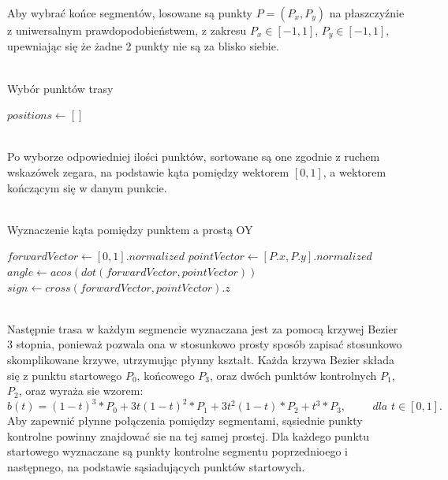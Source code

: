 Aby wybrać końce segmentów, losowane są punkty $P=(P_x,P_y)$ na płaszczyźnie z uniwersalnym prawdopodobieństwem, z zakresu $P_x \in [-1, 1]$, $P_y \in [-1, 1]$, upewniając się że żadne 2 punkty nie są za blisko siebie.
\\\phantom{.}\\
\begin{algorithm}[H]
\caption{Wybór punktów trasy}\label{alg:two}
$positions \gets []$\;
\end{algorithm}
\phantom{.}\\
Po wyborze odpowiedniej ilości punktów, sortowane są one zgodnie z ruchem wskazówek zegara, na podstawie kąta pomiędzy wektorem $[0, 1]$, a wektorem kończącym się w danym punkcie.
\\\\
\begin{algorithm}[H]
    \caption{Wyznaczenie kąta pomiędzy punktem a prostą OY}\label{alg:two}
    $forwardVector \gets [0, 1].normalized$\;
    $pointVector \gets [P.x, P.y].normalized$\;
    $angle \gets acos(dot(forwardVector, pointVector))$ 
    $sign \gets cross(forwardVector, pointVector).z$ 
     {
        \;
    }
\end{algorithm}
\phantom{.}\\
Następnie trasa w każdym segmencie wyznaczana jest za pomocą krzywej Bezier 3 stopnia, ponieważ pozwala ona w stosunkowo prosty sposób zapisać stosunkowo skomplikowane krzywe, utrzymując płynny kształt. Każda krzywa Bezier składa się z punktu startowego $P_0$, końcowego $P_3$, oraz dwóch punktów kontrolnych $P_1$, $P_2$, oraz wyraża sie wzorem:
\[ b(t) = (1 - t)^3 * P_0 + 3t(1-t)^2 * P_1 + 3t^2 (1-t) * P_2 + t^3 * P_3, \hspace{1cm}\textit{dla } t \in [0, 1]. \]
Aby zapewnić płynne połączenia pomiędzy segmentami, sąsiednie punkty kontrolne powinny znajdować sie na tej samej prostej. Dla każdego punktu startowego wyznaczane są punkty kontrolne segmentu poprzednioego i następnego, na podstawie sąsiadujących punktów startowych.

